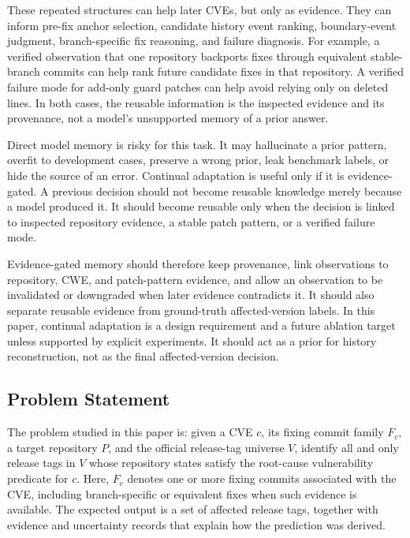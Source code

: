 These repeated structures can help later CVEs, but only as evidence. They can inform pre-fix anchor selection, candidate history event ranking, boundary-event judgment, branch-specific fix reasoning, and failure diagnosis. For example, a verified observation that one repository backports fixes through equivalent stable-branch commits can help rank future candidate fixes in that repository. A verified failure mode for add-only guard patches can help avoid relying only on deleted lines. In both cases, the reusable information is the inspected evidence and its provenance, not a model's unsupported memory of a prior answer.

Direct model memory is risky for this task. It may hallucinate a prior pattern, overfit to development cases, preserve a wrong prior, leak benchmark labels, or hide the source of an error. Continual adaptation is useful only if it is evidence-gated. A previous decision should not become reusable knowledge merely because a model produced it. It should become reusable only when the decision is linked to inspected repository evidence, a stable patch pattern, or a verified failure mode.

Evidence-gated memory should therefore keep provenance, link observations to repository, CWE, and patch-pattern evidence, and allow an observation to be invalidated or downgraded when later evidence contradicts it. It should also separate reusable evidence from ground-truth affected-version labels. In this paper, continual adaptation is a design requirement and a future ablation target unless supported by explicit experiments. It should act as a prior for history reconstruction, not as the final affected-version decision.

\subsection{Problem Statement}

The problem studied in this paper is: given a CVE $c$, its fixing commit family $F_c$, a target repository $P$, and the official release-tag universe $V$, identify all and only release tags in $V$ whose repository states satisfy the root-cause vulnerability predicate for $c$. Here, $F_c$ denotes one or more fixing commits associated with the CVE, including branch-specific or equivalent fixes when such evidence is available. The expected output is a set of affected release tags, together with evidence and uncertainty records that explain how the prediction was derived.

